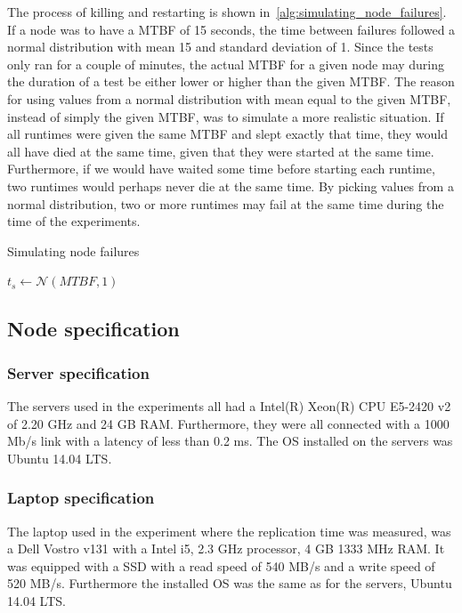 \documentclass{cslthse-msc}
\begin{document}
The process of killing and restarting is shown in~\cref{alg:simulating_node_failures}. If a node was to have a MTBF of 15 seconds, the time between failures followed a normal distribution with mean 15 and standard deviation of 1. Since the tests only ran for a couple of minutes, the actual MTBF for a given node may during the duration of a test be either lower or higher than the given MTBF. The reason for using values from a normal distribution with mean equal to the given MTBF, instead of simply the given MTBF, was to simulate a more realistic situation. If all runtimes were given the same MTBF and slept exactly that time, they would all have died at the same time, given that they were started at the same time. Furthermore, if we would have waited some time before starting each runtime, two runtimes would perhaps never die at the same time. By picking values from a normal distribution, two or more runtimes may fail at the same time during the time of the experiments.

\begin{algorithm} 
	\caption{Simulating node failures} \label{alg:simulating_node_failures}
	\begin{algorithmic}[1]
		\State
		\State $t_{s}\gets \mathcal{N} (MTBF,1)$
		\State
		\State
	\EndWhile
	\end{algorithmic}
\end{algorithm}

\subsection{Node specification}
\subsubsection{Server specification} \label{sec:server_spec}
The servers used in the experiments all had a Intel(R) Xeon(R) CPU E5-2420 v2 of 2.20 GHz and 24 GB RAM. Furthermore, they were all connected with a 1000 Mb/s link with a latency of less than 0.2 ms. The OS installed on the servers was Ubuntu 14.04 LTS.

\subsubsection{Laptop specification} \label{sec:laptop_spec}
The laptop used in the experiment where the replication time was measured, was a Dell Vostro v131 with a Intel i5, 2.3 GHz processor, 4 GB 1333 MHz RAM. It was equipped with a SSD with a read speed of 540 MB/s and a write speed of 520 MB/s. Furthermore the installed OS was the same as for the servers, Ubuntu 14.04 LTS.
\end{document}
